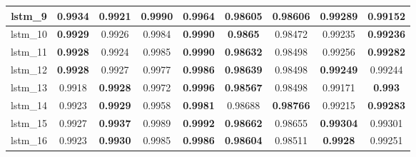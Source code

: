 \begin{table}[p]
\begin{tabular} {|c|c|c|c|c|c|c|c|c| }
        lstm\_9  & \textbf{\cellcolor{green!50}0.9934} & 0.9921                              & \textbf{0.9990}             & 0.9964                              & 0.98605                     & \textbf{0.98606}                     & \textbf{0.99289}                     & 0.99152                     \\ \hline
        lstm\_10 & \textbf{0.9929}                     & 0.9926                              & 0.9984                      & \textbf{0.9990}                     & \textbf{0.9865}             & 0.98472                              & 0.99235                              & \textbf{0.99236}            \\ \hline
        lstm\_11 & \textbf{0.9928}                     & 0.9924                              & 0.9985                      & \textbf{0.9990}                     & \textbf{0.98632}            & 0.98498                              & 0.99256                              & \textbf{0.99282}            \\ \hline
        lstm\_12 & \textbf{0.9928}                     & 0.9927                              & 0.9977                      & \textbf{0.9986}                     & \textbf{0.98639}            & 0.98498                              & \textbf{0.99249}                     & 0.99244                     \\ \hline
        lstm\_13 & 0.9918                              & \textbf{0.9928}                     & 0.9972                      & \textbf{0.9996}                     & \textbf{0.98567}            & 0.98498                              & 0.99171                              & \textbf{0.993}              \\ \hline
        lstm\_14 & 0.9923                              & \textbf{0.9929}                     & 0.9958                      & \textbf{0.9981}                     & \cellcolor{green!50}0.98688 & \textbf{\cellcolor{green!50}0.98766} & 0.99215                              & \textbf{0.99283}            \\ \hline
        lstm\_15 & 0.9927                              & \textbf{\cellcolor{green!50}0.9937} & 0.9989                      & \textbf{0.9992}                     & \textbf{0.98662}            & 0.98655                              & \textbf{0.99304}                     & 0.99301                     \\ \hline
        lstm\_16 & 0.9923                              & \textbf{0.9930}                     & 0.9985                      & \textbf{0.9986}                     & \textbf{0.98604}            & 0.98511                              & \textbf{0.9928}                      & 0.99251                     \\ \hline

\end{tabular}
\end{table}
